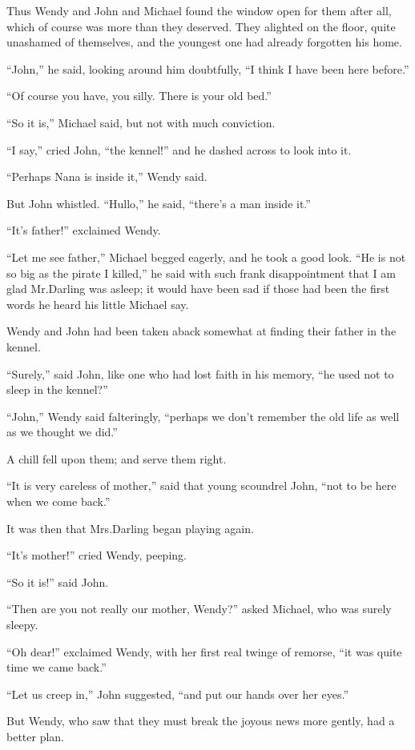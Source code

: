 Thus Wendy and John and Michael found the window open for them after all,
which of course was more than they deserved.
They alighted on the floor, quite unashamed of themselves,
and the youngest one had already forgotten his home.

“John,” he said, looking around him doubtfully,
“I think I have been here before.”

“Of course you have, you silly.
There is your old bed.”

“So it is,” Michael said, but not with much conviction.

“I say,” cried John, “the kennel!\@” and he dashed across to look into it.

“Perhaps Nana is inside it,” Wendy said.

But John whistled.
“Hullo,” he said, “there’s a man inside it.”

“It’s father!\@” exclaimed Wendy.

“Let me see father,” Michael begged eagerly, and he took a good look.
“He is not so big as the pirate I killed,”
he said with such frank disappointment that I am glad Mr.\@ Darling was asleep;
it would have been sad if those had been the first words he heard his little Michael say.

Wendy and John had been taken aback somewhat at finding their father in the kennel.

“Surely,” said John, like one who had lost faith in his memory,
“he used not to sleep in the kennel?”

“John,” Wendy said falteringly,
“perhaps we don’t remember the old life as well as we thought we did.”

A chill fell upon them;
and serve them right.

“It is very careless of mother,” said that young scoundrel John,
“not to be here when we come back.”

It was then that Mrs.\@ Darling began playing again.

“It’s mother!\@” cried Wendy, peeping.

“So it is!\@” said John.

“Then are you not really our mother, Wendy?\@” asked Michael, who was surely sleepy.

“Oh dear!\@” exclaimed Wendy, with her first real twinge of remorse,
“it was quite time we came back.”

“Let us creep in,” John suggested,
“and put our hands over her eyes.”

But Wendy, who saw that they must break the joyous news more gently,
had a better plan.

